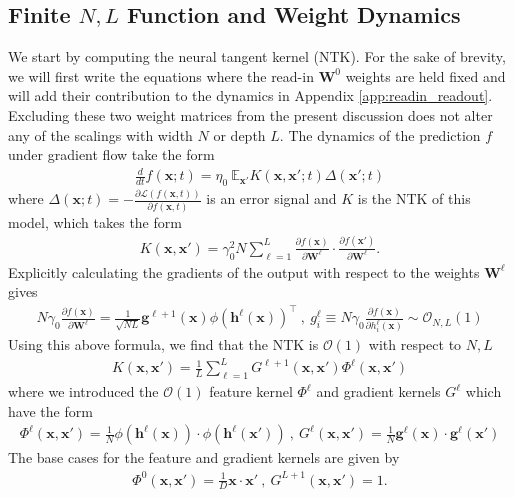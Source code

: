 \documentclass{article} %
\def\h{\bm h}
\def\x{\bm x}
\def\g{\bm g}
\def\W{\bm W}
\begin{document}
\subsection{Finite $N,L$ Function and Weight Dynamics}
We start by computing the neural tangent kernel (NTK). For the sake of brevity, we will first write the equations where the read-in $\W^0$ weights are held fixed and will add their contribution to the dynamics in Appendix \ref{app:readin_readout}. Excluding these two weight matrices from the present discussion does not alter any of the scalings with width $N$ or depth $L$. The dynamics of the prediction $f$ under gradient flow take the form
\begin{align}
    \frac{d}{dt} f(\x;t) = \eta_0 \  \mathbb{E}_{\x'} K(\x,\x';t) \Delta(\x';t)
\end{align}
where $\Delta(\x;t) = - \frac{\partial \mathcal{L}(f(\x,t))}{\partial f(\x,t)}$ is an error signal and $K$ is the NTK of this model, which takes the form
\begin{align}
    K(\x,\x') = \gamma_0^2 N \sum_{\ell=1}^L \frac{\partial f(\x)}{\partial \W^{\ell}} \cdot \frac{\partial f(\x')}{\partial \W^{\ell}} . 
\end{align}
Explicitly calculating the gradients of the output with respect to the weights $\W^\ell$ gives
\begin{align}
    N \gamma_0 \frac{\partial f(\x)}{\partial \W^\ell} = \frac{1}{\sqrt{N L }} \g^{\ell+1}(\x) \phi(\h^\ell(\x))^\top \ , \ g_i^{\ell} \equiv N \gamma_0 \frac{\partial f(\x)}{\partial h_i^{\ell}(\x)} \sim \mathcal{O}_{N,L}(1) 
\end{align}
Using this above formula, we find that the NTK is $\mathcal{O}(1)$ with respect to $N, L$ 
\begin{align}
    K(\x,\x') = \frac{1}{L} \sum_{\ell=1}^{L}  G^{\ell+1}(\x,\x') \Phi^\ell(\x,\x')
\end{align}
where we introduced the $\mathcal{O}(1)$ feature kernel $\Phi^\ell$ and gradient kernels $G^\ell$ which have the form
\begin{align}
    \Phi^\ell(\x,\x') = \frac{1}{N} \phi(\h^\ell(\x)) \cdot \phi(\h^\ell(\x')) \ , \ G^{\ell}(\x,\x') = \frac{1}{N} \g^\ell(\x) \cdot \g^\ell(\x')
\end{align}
The base cases for the feature and gradient kernels are given by
\begin{align}
    \Phi^0(\x,\x') = \frac{1}{D} \x \cdot \x' \ , \ G^{L+1}(\x,\x') = 1 .
\end{align}
\end{document}
